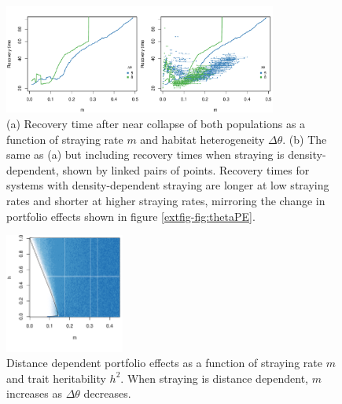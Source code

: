 \documentclass{revtex4}
\begin{document}
\begin{figure}
  \captionsetup{justification=raggedright,
singlelinecheck=false
}
\centering
\includegraphics[width=0.8\textwidth]{figs2/fig_relaxtheta2.pdf}
\caption{
(a) Recovery time after near collapse of both populations as a function of straying rate $m$ and habitat heterogeneity $\Delta\theta$.
(b) The same as (a) but including recovery times when straying is density-dependent, shown by linked pairs of points.
Recovery times for systems with density-dependent straying are longer at low straying rates and shorter at higher straying rates, mirroring the change in portfolio effects shown in figure \ref{extfig-fig:thetaPE}.
} \label{fig:relaxtheta}
\end{figure}


\begin{figure}
  \captionsetup{justification=raggedright,
singlelinecheck=false
}
  \centering
  \includegraphics[width=0.35\textwidth]{figs2/fig_MDPE_hm_mtheta_rt.pdf}
  \caption{
  Distance dependent portfolio effects as a function of straying rate $m$ and trait heritability $h^2$. When straying is distance dependent, $m$ increases as $\Delta\theta$ decreases.
  } \label{fig:mthetaPE}
\end{figure}
\end{document}
